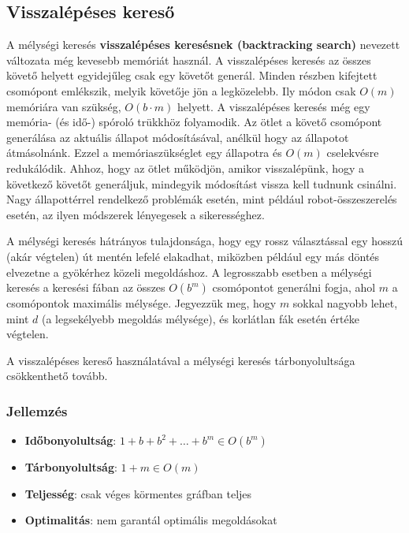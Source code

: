 \subsection{Visszalépéses kereső}

A mélységi keresés {\bf visszalépéses keresésnek (backtracking search)} nevezett
változata még kevesebb memóriát használ. A visszalépéses keresés az összes
követő helyett egyidejűleg csak egy követőt generál.  Minden részben kifejtett
csomópont emlékszik, melyik követője jön a legközelebb. Ily módon csak $O(m)$
memóriára van szükség, $O(b\cdot m)$ helyett. A visszalépéses keresés még egy memória-
(és idő-) spóroló trükkhöz folyamodik. Az ötlet a követő csomópont generálása
az aktuális állapot módosításával, anélkül hogy az állapotot átmásolnánk. Ezzel
a memóriaszükséglet egy állapotra és $O(m)$ cselekvésre redukálódik. Ahhoz, hogy
az ötlet működjön, amikor visszalépünk, hogy a következő követőt generáljuk,
mindegyik módosítást vissza kell tudnunk csinálni. Nagy állapottérrel
rendelkező problémák esetén, mint például robot-összeszerelés esetén, az ilyen
módszerek lényegesek a sikerességhez.

A mélységi keresés hátrányos tulajdonsága, hogy egy rossz választással egy
hosszú (akár végtelen) út mentén lefelé elakadhat, miközben például egy más
döntés elvezetne a gyökérhez közeli megoldáshoz. A legrosszabb esetben a
mélységi keresés a keresési fában az összes $O(b^m)$ csomópontot generálni fogja,
ahol $m$ a csomópontok maximális mélysége. Jegyezzük meg, hogy $m$ sokkal nagyobb
lehet, mint $d$ (a legsekélyebb megoldás mélysége), és korlátlan fák esetén
értéke végtelen.

\begin{megjegyzes}
    A visszalépéses kereső használatával a mélységi keresés tárbonyolultsága
    csökkenthető tovább.
\end{megjegyzes}

\subsubsection{Jellemzés}

\begin{itemize}
    \item {\bf Időbonyolultság}: $1 + b + b^2 + \ldots + b^m \in O(b^m)$
    \item {\bf Tárbonyolultság}: $1 + m \in O(m)$
    \item {\bf Teljesség}: csak véges körmentes gráfban teljes
    \item {\bf Optimalitás}: nem garantál optimális megoldásokat
\end{itemize}

